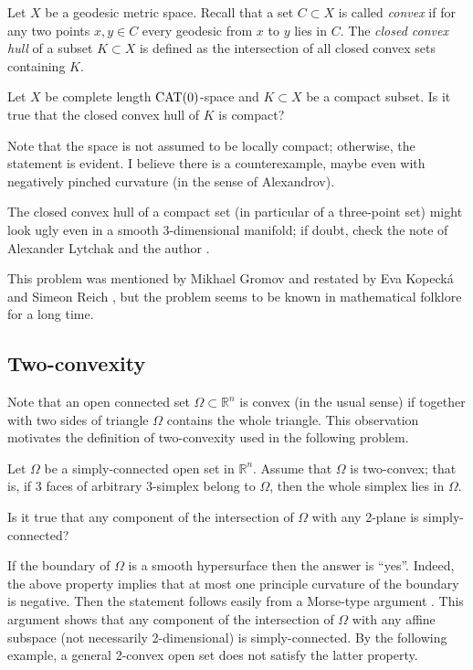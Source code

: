 Let $X$ be a geodesic metric space.
Recall that a set $C\subset X$ is called \emph{convex} if for any two points $x,y\in C$ every geodesic from $x$ to $y$ lies in $C$. 
The \emph{closed convex hull} of a subset $K\subset X$ is defined as the intersection of all closed convex sets containing $K$.


\begin{pr}
Let $X$ be complete length $\mathop{\rm CAT}(0)$-space and $K\subset X$ be a compact subset.
Is it true that the closed convex hull of $K$ is compact?
\end{pr}


Note that the space is not assumed to be locally compact; otherwise, the statement is evident.
I believe there is a counterexample, maybe even with negatively pinched curvature (in the sense of Alexandrov).

The closed convex hull of a compact set (in particular of a three-point set) might look ugly even in a smooth 3-dimensional manifold; if doubt, check the note of Alexander Lytchak and the author \cite{lytchak-petrunin}.

This problem was mentioned by Mikhael Gromov \cite[6.B$_1\text{(f)}$]{gromov-asymptotic}
and restated by Eva Kopeck\'a and Simeon Reich \cite{kopecka-reich}, 
but the problem seems to be known in mathematical folklore for a long time. 



\subsection*{Two-convexity}
\label{Two-convexity}

Note that an open connected set $\Omega\subset\mathbb R^n$ is convex (in the usual sense) if together with two sides of triangle $\Omega$ contains the whole triangle.
This observation motivates the definition of two-convexity used in the following problem.


\begin{pr}
Let $\Omega$ be a simply-connected open set in $\mathbb R^n$.
Assume that $\Omega$ is two-convex; that is, if 3 faces of arbitrary 3-simplex belong to $\Omega$, then the whole simplex lies in $\Omega$.

Is it true that any component of the intersection of $\Omega$ with any 2-plane is simply-connected?
\end{pr}


If the boundary of $\Omega$ is a smooth hypersurface then the answer is ``yes''.
Indeed, the above property implies that at most one principle curvature of the boundary is negative.
Then the statement follows easily from a Morse-type argument \cite[see Lefschetz theorem in Section~$\tfrac12$ in][]{gromov-SGMC}.
This argument shows that any component of the intersection of $\Omega$ with any affine subspace (not necessarily 2-dimensional) is simply-connected.
By the following example, a general 2-convex open set does not satisfy the latter property.


